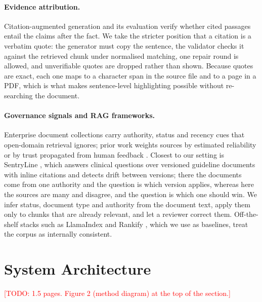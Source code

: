 \documentclass[11pt]{article}
\newcommand{\todo}[1]{\textcolor{red}{[TODO: #1]}}
\begin{document}
\paragraph{Evidence attribution.}
Citation-augmented generation and its evaluation \citep{gao2023alce} verify
whether cited passages entail the claims after the fact. We take the
stricter position that a citation is a verbatim quote: the generator must
copy the sentence, the validator checks it against the retrieved chunk
under normalised matching, one repair round is allowed, and unverifiable
quotes are dropped rather than shown. Because quotes are exact, each one
maps to a character span in the source file and to a page in a PDF, which
is what makes sentence-level highlighting possible without re-searching
the document.

\paragraph{Governance signals and RAG frameworks.}
Enterprise document collections carry authority, status and recency cues
that open-domain retrieval ignores; prior work weights sources by estimated
reliability \citep{rarag2024} or by trust propagated from human feedback
\citep{trustprop2026}. Closest to our setting is SentryLine
\citep{kumar-etal-2026-sentryline}, which answers clinical questions over
versioned guideline documents with inline citations and detects drift
between versions; there the documents come from one authority and the
question is which version applies, whereas here the sources are many and
disagree, and the question is which one should win. We infer status,
document type and authority from the document text, apply them only to
chunks that are already relevant, and let a reviewer correct them.
Off-the-shelf stacks such as LlamaIndex \citep{llamaindex} and Rankify
\citep{rankify2026}, which we use as baselines, treat the corpus as
internally consistent.

\section{System Architecture}
\todo{1.5 pages. Figure 2 (method diagram) at the top of the section.}
\end{document}
